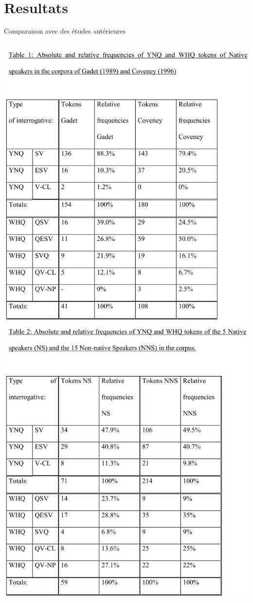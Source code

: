 \documentclass{beamer}
\begin{document}
  \section{Resultats}
    \begin{frame}[t]{Comparaison avec des études antérieures}
      \begin{columns}
          \includegraphics[scale=0.32]{gadet_coveney.jpg}
          \includegraphics[scale=0.32]{resultats.jpg}
      \end{columns}
    \end{frame}
\end{document}
